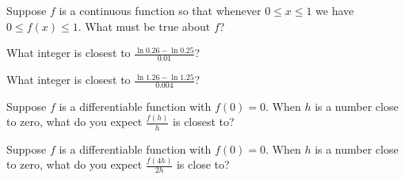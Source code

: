 \documentclass{ximera}
\begin{document}
\begin{problem}
  Suppose $f$ is a continuous function so that whenever $0 \leq x \leq 1$ we have $0 \leq f(x) \leq 1$.  What must be true about $f$?
  \begin{multipleChoice}
  \end{multipleChoice}
\end{problem}



\begin{problem}
  What integer is closest to $\frac{\ln 0.26 - \ln 0.25}{0.01}$?
  \begin{multipleChoice}
  \end{multipleChoice}
\end{problem}

\begin{problem}
  What integer is closest to $\frac{\ln 1.26 - \ln 1.25}{0.004}$?
  \begin{multipleChoice}
  \end{multipleChoice}
\end{problem}

\begin{problem}
  Suppose $f$ is a differentiable function with $f(0) = 0$.  When $h$
  is a number close to zero, what do you expect $\frac{f(h)}{h}$ is
  closest to?
  \begin{multipleChoice}
  \end{multipleChoice}
\end{problem}

\begin{problem}
  Suppose $f$ is a differentiable function with $f(0)=0$.  When $h$ is
  a number close to zero, what do you expect $\frac{f(4h)}{2h}$ is
  close to?
  \begin{multipleChoice}
  \end{multipleChoice}
\end{problem}
\end{document}

